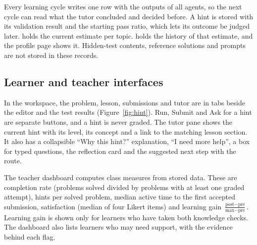 Every learning cycle writes one  row with the outputs of all agents, so the next cycle can read what the tutor concluded and decided before. A hint is stored with its validation result and the starting pass ratio, which lets its outcome be judged later.  holds the current estimate per topic.  holds the history of that estimate, and the profile page shows it. Hidden-test contents, reference solutions and prompts are not stored in these records.

\subsection{Learner and teacher interfaces}
In the workspace, the problem, lesson, submissions and tutor are in tabs beside the editor and the test results (Figure~\ref{fig:hint}). Run, Submit and Ask for a hint are separate buttons, and a hint is never graded. The tutor pane shows the current hint with its level, its concept and a link to the matching lesson section. It also has a collapsible ``Why this hint?'' explanation, ``I need more help'', a box for typed questions, the reflection card and the suggested next step with the route.

The teacher dashboard computes class measures from stored data. These are completion rate (problems solved divided by problems with at least one graded attempt), hints per solved problem, median active time to the first accepted submission, satisfaction (median of four Likert items) and learning gain $\frac{\text{post}-\text{pre}}{\text{max}-\text{pre}}$. Learning gain is shown only for learners who have taken both knowledge checks. The dashboard also lists learners who may need support, with the evidence behind each flag.

